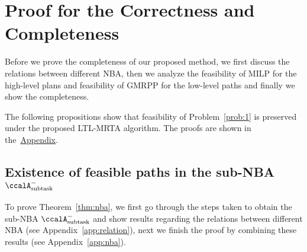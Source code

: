 \documentclass[Afour,sageh,times]{sagej}
\newcommand{\auto}[1]{\ccalA_{\textup{#1}}}
\begin{document}
{\section{Proof for the Correctness and Completeness}\label{app:correctness}
Before we prove the completeness  of our proposed method, we first discuss the relations between different NBA, then we analyze the feasibility of MILP for the high-level plans and feasibility of GMRPP for the low-level paths and finally we show the completeness.

  The following propositions show that feasibility of Problem~\ref{prob:1} is preserved under the proposed LTL-MRTA algorithm. The proofs are shown in the~\hyperref[sec:appendix]{Appendix}.

  \subsection{Existence of feasible paths in the sub-NBA $\auto{subtask}^-$}\label{app:existence}
  To prove Theorem~\ref{thm:nba},  we first go through the steps taken to obtain the sub-NBA $\auto{subtask}^-$ and show results regarding the relations between different NBA (see Appendix~\ref{app:relation}), next we finish the proof by combining these results (see Appendix~\ref{app:nba}).
}
\end{document}
